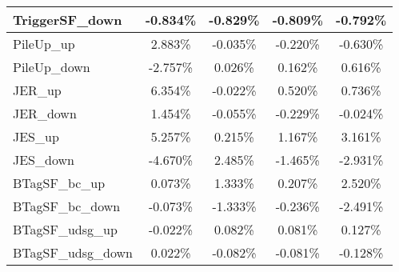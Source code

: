 \begin{table}[]
{\begin{tabular}{|l|c|c|c|c|}
TriggerSF\_down                             & -0.834\%                              & -0.829\%                              & -0.809\%                             & -0.792\%                              \\ \hline
PileUp\_up                             & 2.883\%                              & -0.035\%                              & -0.220\%                             & -0.630\%                              \\ \hline
PileUp\_down                           & -2.757\%                            & 0.026\%                            & 0.162\%                           & 0.616\%                            \\ \hline
JER\_up                         & 6.354\%                          & -0.022\%                          & 0.520\%                         & 0.736\%                          \\ \hline
JER\_down                       & 1.454\%                        & -0.055\%                        & -0.229\%                       & -0.024\%                        \\ \hline
JES\_up                                 & 5.257\%                                  & 0.215\%                                  & 1.167\%                                 & 3.161\%                                  \\ \hline
JES\_down                               & -4.670\%                                & 2.485\%                                & -1.465\%                               & -2.931\%                                \\ \hline
BTagSF\_bc\_up                              & 0.073\%                               & 1.333\%                               & 0.207\%                              & 2.520\%                               \\ \hline
BTagSF\_bc\_down                            & -0.073\%                             & -1.333\%                             & -0.236\%                            & -2.491\%                             \\ \hline
BTagSF\_udsg\_up                            & -0.022\%                             & 0.082\%                             & 0.081\%                            & 0.127\%                             \\ \hline
BTagSF\_udsg\_down                          & 0.022\%                           & -0.082\%                           & -0.081\%                          & -0.128\%                           \\ \hline

\end{tabular}}
\end{table}
